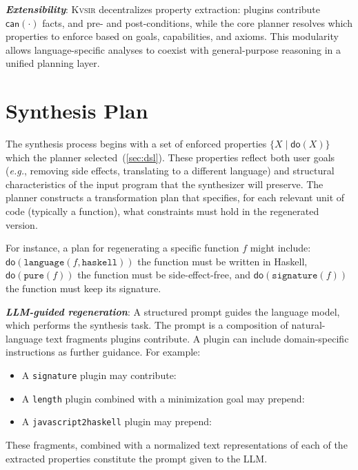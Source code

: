 \documentclass[noacm,sigplan]{acmart}
\def\eg{{\em e.g.}, }
\newcommand{\sys}{{\scshape Kv{\textalpha}sir}\xspace}
\newcommand{\heading}[1]{\vspace{2pt}\noindent\textbf{\emph{#1}}:\enspace}
\newcommand{\ttt}[1]{\texttt{#1}\xspace}
\begin{document}
\heading{Extensibility}
\sys decentralizes property extraction: plugins contribute $\mathsf{can}(\cdot)$ facts, and pre- and post-conditions, while the core planner resolves which properties to enforce based on goals, capabilities, and axioms.
This modularity allows language-specific analyses to coexist with general-purpose reasoning in a unified planning layer.

\section{Synthesis Plan}
\label{sec:synthesis}

The synthesis process begins with a set of enforced properties $\{ X \mid \mathsf{do}(X) \}$
which the planner selected~(\cref{sec:dsl}).
These properties
reflect both user goals (\eg removing side effects, translating to a
different language) and structural characteristics of the input program that
the synthesizer will preserve.
The planner constructs a transformation plan that
specifies, for each relevant unit of code (typically a function), what
constraints must hold in the regenerated version.

For instance, a plan for regenerating a specific function $f$ might include:
\(\mathsf{do}(\texttt{language}(f, \texttt{haskell}))\) the function must be written in Haskell, 
\(\mathsf{do}(\texttt{pure}(f))\) the function must be side-effect-free, and 
\(\mathsf{do}(\texttt{signature}(f))\) the function must keep its signature.

\heading{LLM-guided regeneration}
A structured prompt guides the language model, which performs the synthesis task.
The prompt is a composition of natural-language text fragments plugins contribute. 
A plugin can include domain-specific instructions as further guidance.
For example:
\begin{itemize}
  \item A \ttt{signature} plugin may contribute: \emph{}
  \item A \ttt{length} plugin combined with a minimization goal may prepend: \emph{}
  \item A \ttt{javascript2haskell} plugin may prepend: \emph{}
\end{itemize}

These fragments, combined with a normalized text representations of each of 
the extracted properties constitute the prompt given to the LLM.
\end{document}
